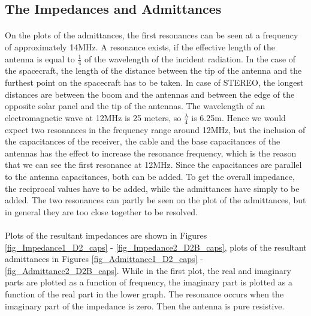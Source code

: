 \documentclass[a4paper,10pt]{thesis}
\begin{document}
\subsection{The Impedances and Admittances}
\paragraph*{}
On the plots of the admittances, the first resonances can be seen
at a frequency of approximately 14MHz. A resonance exists, if the
effective length of the antenna is equal to $\frac{1}{4}$ of the
wavelength of the incident radiation. In the case of the
spacecraft, the length of the distance between the tip of the
antenna and the furthest point on the spacecraft has to be taken.
In case of STEREO, the longest distances are between the boom and
the antennas and between the edge of the opposite solar panel and
the tip of the antennas. The wavelength of an
electromagnetic wave at 12MHz is 25 meters, so $\frac{\lambda}{4}$
is 6.25m. Hence we would expect two resonances in
the frequency range around 12MHz, but the inclusion of the capacitances of the receiver, the cable and the base capacitances of the antennas has the effect to increase the resonance frequency, which is the reason that we can see the first resonance at 12MHz. Since the capacitances are parallel to the antenna capacitances, both can be added. To get the overall impedance, the reciprocal values have to be added, while the admittances have simply to be added. The two resonances can partly be seen on the plot of the admittances, but in general they are too close together to be resolved.


\paragraph*{}
 Plots of the resultant impedances are shown in Figures \ref{fig_Impedance1_D2_caps} - \ref{fig_Impedance2_D2B_caps}, plots of the resultant admittances in Figures \ref{fig_Admittance1_D2_caps} - \ref{fig_Admittance2_D2B_caps}. While in the first plot, the real and imaginary parts are plotted as a function of frequency, the imaginary part is plotted as a function of the real part in the lower graph. The resonance occurs when the imaginary part of the impedance is zero. Then the antenna is pure resistive.
\end{document}
